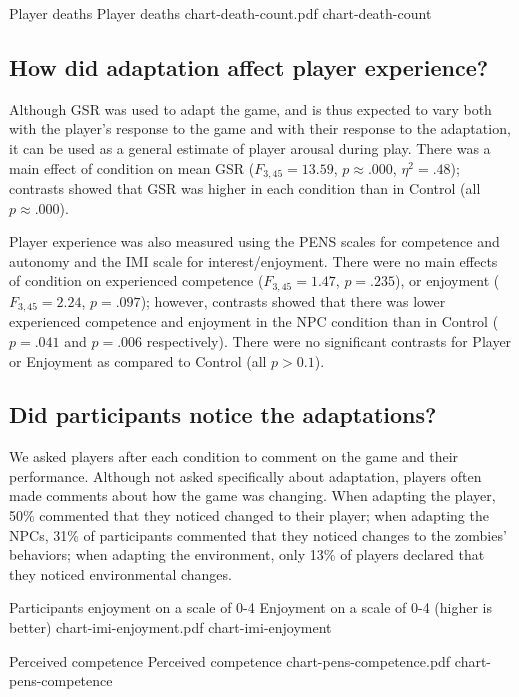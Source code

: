 \img
{Player deaths}
{Player deaths}
{chart-death-count.pdf}
{chart-death-count}

\subsection{How did adaptation affect player experience?}

Although GSR was used to adapt the game, and is thus expected to vary both with the player's response to the game and with their response to the adaptation, it can be used as a general estimate of player arousal during play. There was a main effect of condition on mean GSR ($F_{3,45} = 13.59$, $p \approx .000$, $\eta^{2} = .48$); contrasts showed that GSR was higher in each condition than in Control (all $p \approx .000$).

Player experience was also measured using the PENS scales for competence and autonomy and the IMI scale for interest/enjoyment. There were no main effects of condition on experienced competence ($F_{3,45} = 1.47$, $p = .235$), or enjoyment ($F_{3,45} = 2.24$, $p = .097$); however, contrasts showed that there was lower experienced competence and enjoyment in the NPC condition than in Control ($p = .041$ and $p = .006$ respectively). There were no significant contrasts for Player or Enjoyment as compared to Control (all $p > 0.1$).

\subsection{Did participants notice the adaptations?}

We asked players after each condition to comment on the game and their performance. Although not asked specifically about adaptation, players often made comments about how the game was changing. When adapting the player, 50\% commented that they noticed changed to their player; when adapting the NPCs, 31\% of participants commented that they noticed changes to the zombies' behaviors; when adapting the environment, only 13\% of players declared that they noticed environmental changes.


\img
{Participants enjoyment on a scale of 0-4}
{Enjoyment on a scale of 0-4 (higher is better)}
{chart-imi-enjoyment.pdf}
{chart-imi-enjoyment}

\img
{Perceived competence}
{Perceived competence}
{chart-pens-competence.pdf}
{chart-pens-competence}


